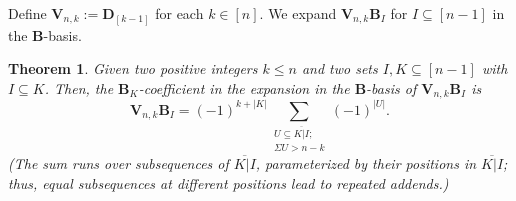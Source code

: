 \documentclass[revision]{FPSAC2025}
\newtheorem{theorem}{Theorem}
\begin{document}
\noindent Define $\mathbf{V}_{n,k}:=\mathbf{D}_{\left[  k-1\right]  }$ for each $k \in \left[n\right]$. We expand $\mathbf{V}_{n,k}\mathbf{B}_I$ for $I\subseteq [n-1]$ in the  $\mathbf{B}$-basis.
%

\begin{theorem}
\label{thm.vnk}
Given two positive integers $k\leq n$ and two sets $I,K \subseteq [n-1]$ with $I \subseteq K$.
Then, the $\mathbf{B}_K$-coefficient in the expansion in the $\mathbf{B}$-basis of $\mathbf{V}_{n,k}\mathbf{B}_I$ is 
\begin{equation}
[\mathbf{B}_K]\mathbf{V}_{n,k}\mathbf{B}_I = (-1)^{k + |K|}\sum_{\substack{U \subseteq \overline{ K|I};\\ \Sigma U > n-k} }(-1)^{|U|}.
\end{equation}
(The sum runs over subsequences of $\overline{ K|I}$, parameterized by their positions in $\overline{ K|I}$; thus, equal subsequences at different positions lead to repeated addends.)
\end{theorem}
\end{document}
